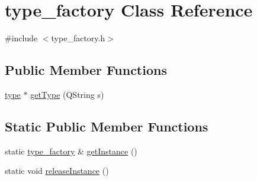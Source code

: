 \hypertarget{classtype__factory}{\section{type\-\_\-factory Class Reference}
\label{classtype__factory}
}


{\ttfamily \#include $<$type\-\_\-factory.\-h$>$}

\subsection*{Public Member Functions}
\begin{DoxyCompactItemize}
\item 
\hyperlink{classtype}{type} $\ast$ \hyperlink{classtype__factory_a144da545ae1616b3e9e644ad0df9564c}{get\-Type} (Q\-String s)
\end{DoxyCompactItemize}
\subsection*{Static Public Member Functions}
\begin{DoxyCompactItemize}
\item 
static \hyperlink{classtype__factory}{type\-\_\-factory} \& \hyperlink{classtype__factory_a78223a2e795f2fd36ca4b2a1666b59ec}{get\-Instance} ()
\item 
static void \hyperlink{classtype__factory_af91382fb401454be520fe8cf43ee9245}{release\-Instance} ()
\end{DoxyCompactItemize}


